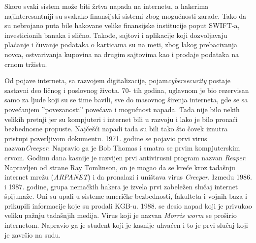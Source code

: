 \documentclass[a4paper]{article}
\begin{document}
{Skoro svaki sistem može biti žrtva napada na internetu, a hakerima najinteresantniji su svakako finansijski sistemi zbog mogućnosti zarade. Tako da su nebrojano puta bile hakovane velike finansijske institucije poput SWIFT-a, investicionih banaka i slično. Takođe, sajtovi i aplikacije koji dozvoljavaju plaćanje i čuvanje podataka o karticama su na meti, zbog lakog prebacivanja novca, ostvarivanja kupovina na drugim sajtovima kao i prodaje podataka na crnom tržistu.

Od pojave interneta, sa razvojem digitalizacije, pojam{\em cybersecurity} postaje sastavni deo ličnog i poslovnog života. 70- tih godina, uglavnom je bio rezervisan samo za ljude koji su se time bavili, sve do masovnog širenja interneta, gde se sa povećanjem ''povezanosti'' povećava i mogućnost napada. Tada nije bilo nekih velikih pretnji jer su kompjuteri i internet bili u razvoju i lako je bilo pronaći bezbednosne propuste. Najčešći napadi tada su bili tako što čovek iznutra pristupi poverljivom dokumentu. 
1971. godine se pojavio prvi virus nazvan{\em Creeper}. Napravio ga je Bob Thomas i smatra se prvim kompjuterskim crvom.
Godinu dana kasnije je razvijen prvi antivirusni program nazvan {\em Reaper}. Napravljen od strane Ray Tomlinson, on je mogao da se kreće kroz tadašnju internet mrežu ({\em ARPANET}) i da pronalazi i uništava virus {\em Creeper}. 
Između 1986. i 1987. godine, grupa nemačkih hakera je izvela prvi zabeležen slučaj internet špijunaže. Oni su upali u sisteme američke bezbednosti, fakulteta i vojnih baza i prikupili informacije koje su prodali KGB-u.
1988. se desio napad koji je privukao veliku pažnju tadašnjih medija. Virus koji je nazvan {\em Morris worm} se proširio internetom. Napravio ga je student koji je kasnije uhvaćen i to je prvi slučaj koji je završio na sudu.\cite{computersecurity}


\newpage

}
\end{document}
